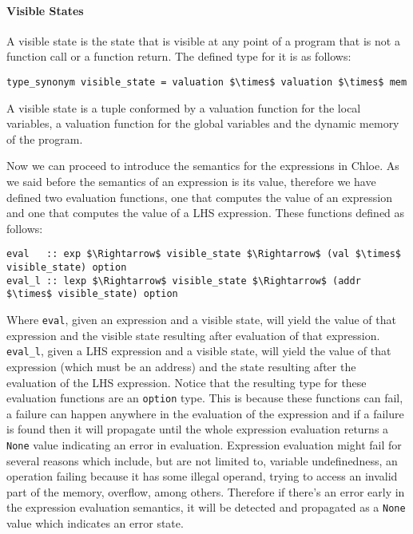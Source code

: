 \paragraph{Visible States}\label{paragraph:visible_state}

A visible state is the state that is visible at any point of a program that is not a function call or a function return.
The defined type for it is as follows:

\begin{lstlisting}[frame=single, mathescape=true]
type_synonym visible_state = valuation $\times$ valuation $\times$ mem
\end{lstlisting}

A visible state is a tuple conformed by a valuation function for the local variables, a valuation function for the global variables and the dynamic memory of the program.


Now we can proceed to introduce the semantics for the expressions in Chloe.
As we said before the semantics of an expression is its value, therefore we have defined two evaluation functions, one that computes the value of an expression and one that computes the value of a LHS expression.
These functions defined as follows:

\begin{lstlisting}[frame=single, mathescape=true]
eval   :: exp $\Rightarrow$ visible_state $\Rightarrow$ (val $\times$ visible_state) option
eval_l :: lexp $\Rightarrow$ visible_state $\Rightarrow$ (addr $\times$ visible_state) option
\end{lstlisting}

Where \verb|eval|, given an expression and a visible state, will yield the value of that expression and the visible state resulting after evaluation of that expression.
\verb|eval_l|, given a LHS expression and a visible state, will yield the value of that expression (which must be an address) and the state resulting after the evaluation of the LHS expression.
Notice that the resulting type for these evaluation functions are an \verb|option| type.
This is because these functions can fail, a failure can happen anywhere in the evaluation of the expression and if a failure is found then it will propagate until the whole expression evaluation returns a \verb|None| value indicating an error in evaluation.
Expression evaluation might fail for several reasons which include, but are not limited to, variable undefinedness, an operation failing because it has some illegal operand, trying to access an invalid part of the memory, overflow, among others.
Therefore if there's an error early in the expression evaluation semantics, it will be detected and propagated as a \verb|None| value which indicates an error state.


